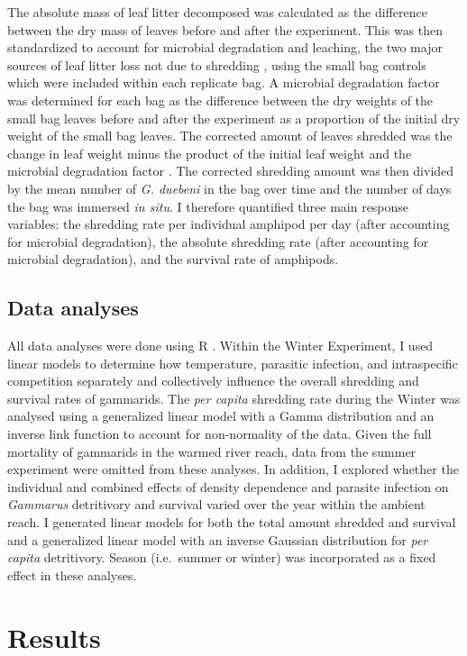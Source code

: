 The absolute mass of leaf litter decomposed was calculated as the difference between the dry mass of leaves before and after the experiment. This was then standardized to account for microbial degradation and leaching, the two major sources of leaf litter loss not due to shredding \citep{cummins1979}, using the small bag controls which were included within each replicate bag. A microbial degradation factor was determined for each bag as the difference between the dry weights of the small bag leaves before and after the experiment as a proportion of the initial dry weight of the small bag leaves. The corrected amount of leaves shredded was the change in leaf weight minus the product of the initial leaf weight and the microbial degradation factor \citep{benfield2006}. The corrected shredding amount was then divided by the mean number of \emph{G. duebeni} in the bag over time and the number of days the bag was immersed \emph{in situ}. I therefore quantified three main response variables: the shredding rate per individual amphipod per day (after accounting for microbial degradation), the absolute shredding rate (after accounting for microbial degradation), and the survival rate of amphipods.

\subsection{Data analyses}

All data analyses were done using R \citep{r2017}. Within the Winter Experiment, I used linear models to determine how temperature, parasitic infection, and intraspecific competition separately and collectively influence the overall shredding and survival rates of gammarids. The \emph{per capita} shredding rate during the Winter was analysed using a generalized linear model with a Gamma distribution and an inverse link function to account for non-normality of the data. Given the full mortality of gammarids in the warmed river reach, data from the summer experiment were omitted from these analyses. In addition, I explored whether the individual and combined effects of density dependence and parasite infection on \emph{Gammarus} detritivory and survival varied over the year within the ambient reach. I generated linear models for both the total amount shredded and survival and a generalized linear model with an inverse Gaussian distribution for \emph{per capita} detritivory. Season (i.e.\ summer or winter) was incorporated as a fixed effect in these analyses. 


\section{Results}

